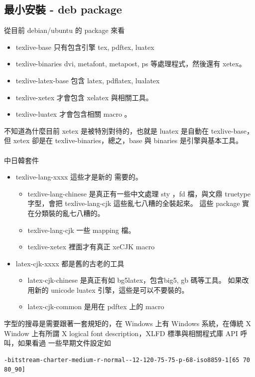 \subsection{最小安裝 - deb package}
從目前 debian/ubuntu 的 package 來看
\begin{itemize}
\item texlive-base 只有包含引擎 tex, pdftex, luatex
\item texlive-binaries dvi, metafont, metapost, ps 等處理程式，然後還有 xetex。
\item texlive-latex-base 包含 latex, pdflatex, lualatex
\item texlive-xetex 才會包含 xelatex 與相關工具。
\item texlive-luatex 才會包含相關 macro 。
\end{itemize}
不知道為什麼目前 xetex 是被特別對待的，也就是 luatex 是自動在 texlive-base，
但 xetex 卻是在 texlive-binaries，總之，base 與 binaries 是引擎與基本工具。
\\\\
中日韓套件
\begin{itemize}
\item texlive-lang-xxxx 這些才是新的 \XeTeX 需要的。
  \begin{itemize}
  \item texlive-lang-chinese 是真正有一些中文處理 sty ，fd 檔，與文鼎
   truetype 字型，會把 texlive-lang-cjk 這些亂七八糟的全裝起來。
   這些 package 實在分類裝的亂七八糟的。
  \item texlive-lang-cjk 一些 mapping 檔。
  \item texlive-xetex 裡面才有真正 xeCJK macro
  \end{itemize}
\item latex-cjk-xxxx 都是舊的古老的工具
  \begin{itemize}
  \item latex-cjk-chinese 是真正有如 bg5latex，包含big5, gb 碼等工具。
        如果改用新的 unicode {\XeTeX} luatex 引擎，這些是可以不要裝的。
  \item latex-cjk-common 是用在 pdftex 上的 macro
  \end{itemize}
\end{itemize}
字型的搜尋是需要跟著一套規矩的，在 Windows 上有 Windows 系統，在傳統 X Window
上有所謂 X logical font description，XLFD 標準與相關程式庫 API 呼叫，如果看過
一些早期文件設定如
\begin{verbatim}
-bitstream-charter-medium-r-normal--12-120-75-75-p-68-iso8859-1[65 70 80_90]
\end{verbatim}
